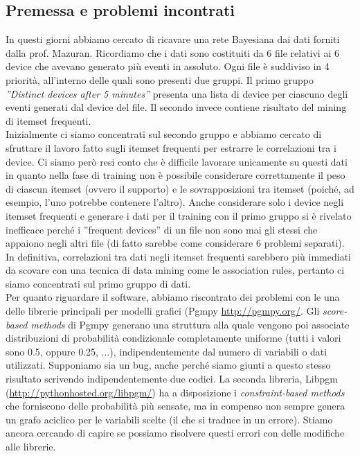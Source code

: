 \documentclass[a4paper]{article}
\begin{document}
\subsection*{Premessa e problemi incontrati}
In questi giorni abbiamo cercato di ricavare una rete Bayesiana dai dati forniti dalla prof. Mazuran. Ricordiamo che i dati sono costituiti da 6 file relativi ai 6 device che avevano generato più eventi in assoluto. Ogni file è suddiviso in 4 priorità, all'interno delle quali sono presenti due gruppi. Il primo gruppo \textit{''Distinct devices after 5 minutes''} presenta una lista di device per ciascuno degli eventi generati dal device del file. Il secondo invece contiene risultato del mining di itemset frequenti. \\
Inizialmente ci siamo concentrati sul secondo gruppo e abbiamo cercato di sfruttare il lavoro fatto sugli itemset frequenti per estrarre le correlazioni tra i device. Ci siamo però resi conto che è difficile lavorare unicamente su questi dati in quanto nella fase di training non è possibile considerare correttamente il peso di ciascun itemset (ovvero il supporto) e le sovrapposizioni tra itemset (poiché, ad esempio, l'uno potrebbe contenere l'altro). Anche considerare solo i device negli itemset frequenti e generare i dati per il training con il primo gruppo si è rivelato inefficace perché i ''frequent devices'' di un file non sono mai gli stessi che appaiono negli altri file (di fatto sarebbe come considerare 6 problemi separati). In definitiva, correlazioni tra dati negli itemset frequenti sarebbero più immediati da scovare con una tecnica di data mining come le association rules, pertanto ci siamo concentrati sul primo gruppo di dati. \\
Per quanto riguardare il software, abbiamo riscontrato dei problemi con le una delle librerie principali per modelli grafici (Pgmpy \url{http://pgmpy.org/}. Gli \textit{score-based methods} di Pgmpy generano una struttura alla quale vengono poi associate distribuzioni di probabilità condizionale completamente uniforme (tutti i valori sono 0.5, oppure 0.25, ...), indipendentemente dal numero di variabili o dati utilizzati. Supponiamo sia un bug, anche perché siamo giunti a questo stesso risultato scrivendo indipendentemente due codici. La seconda libreria, Libpgm (\url{http://pythonhosted.org/libpgm/}) ha a disposizione i \textit{constraint-based methods} che forniscono delle probabilità più sensate, ma in compenso non sempre genera un grafo aciclico per le variabili scelte (il che si traduce in un errore). Stiamo ancora cercando di capire se possiamo risolvere questi errori con delle modifiche alle librerie.
\end{document}
